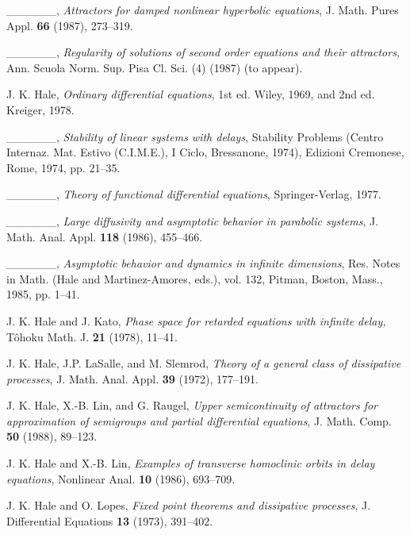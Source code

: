 \documentclass{surv-l}
\theoremstyle{plain}
\theoremstyle{definition}
\numberwithin{equation}{section}
\numberwithin{figure}{chapter}
\begin{document}
\begin{thebibliography}{}
 \_\_\_\_\_\_, \emph{Attractors for damped nonlinear hyperbolic equations}, J. Math. Pures Appl. \textbf{66} (1987), 273--319.

 \_\_\_\_\_\_, \emph{Regularity of solutions of second order equations and their attractors,}
Ann. Scuola Norm. Sup. Pisa Cl. Sci. (4) (1987) (to appear).

J. K. Hale, \emph{Ordinary differential equations}, 1st ed. Wiley, 1969, and 2nd ed. Kreiger, 1978.

 \_\_\_\_\_\_, \emph{Stability of linear systems with delays}, Stability Problems (Centro Internaz. Mat. Estivo (C.I.M.E.), I Ciclo,
Bressanone, 1974), Edizioni Cremonese, Rome, 1974, pp. 21--35.

 \_\_\_\_\_\_, \emph{Theory of functional differential equations}, Springer-Verlag, 1977.

 \_\_\_\_\_\_, \emph{Large diffusivity and asymptotic behavior in parabolic systems}, J. Math. Anal. Appl. \textbf{118} (1986), 455--466.

 \_\_\_\_\_\_, \emph{Asymptotic behavior and dynamics in infinite dimensions}, Res. Notes
in Math. (Hale and Martinez-Amores, eds.), vol. 132, Pitman, Boston, Mass.,
1985, pp. 1--41.

J. K. Hale and J. Kato, \emph{Phase space for retarded equations with infinite delay,}
T\^{o}hoku Math. J. \textbf{21} (1978), 11--41.

J. K. Hale, J.P. LaSalle, and M. Slemrod, \emph{Theory of a general class of dissipative processes}, J. Math. Anal. Appl. \textbf{39} (1972), 177--191.

J. K. Hale, X.-B. Lin, and G. Raugel, \emph{Upper semicontinuity of attractors for approximation of semigroups and partial differential equations}, J. Math. Comp. \textbf{50} (1988), 89--123.

J. K. Hale and X.-B. Lin, \emph{Examples of transverse homoclinic orbits in delay equations}, Nonlinear Anal. \textbf{10} (1986), 693--709.

J. K. Hale and O. Lopes, \emph{Fixed point theorems and dissipative processes}, J.
Differential Equations \textbf{13} (1973), 391--402.


\end{thebibliography}
\end{document}

